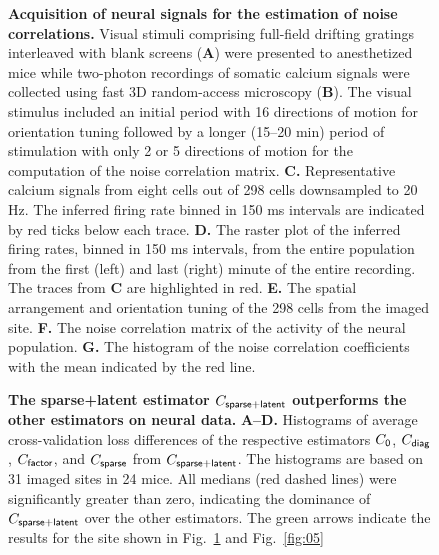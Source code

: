 \documentclass[10pt]{article}
\begin{document}
\begin{figure}[!ht]
    \begin{center}
    \end{center}
    \caption{{\bf Acquisition of neural signals for the estimation of noise correlations.}
    Visual stimuli comprising full-field drifting gratings interleaved with blank screens ({\bf A}) were presented to anesthetized mice while two-photon recordings of somatic calcium signals were collected using fast 3D random-access microscopy ({\bf B}). The visual stimulus included an initial period with 16 directions of motion for orientation tuning followed by a longer (15--20 min) period of stimulation with only 2 or 5 directions of motion for the computation of the noise correlation matrix. 
    {\bf C.} Representative calcium signals from eight cells out of 298 cells downsampled to 20 Hz. The inferred firing rate binned in 150 ms intervals are indicated by red ticks below each trace.
    {\bf D.} The raster plot of the inferred firing rates, binned in 150 ms intervals, from the entire population from the first (left) and last (right) minute of the entire recording.  The traces from {\bf C} are highlighted in red.
    {\bf E.} The spatial arrangement and orientation tuning of the 298 cells from the imaged site.
    {\bf F.} The noise correlation matrix of the activity of the neural population. 
    {\bf G.} The histogram of the noise correlation coefficients with the mean indicated by the red line.
}
    \label{fig:03}
\end{figure}

\begin{figure}[!ht]
    \begin{center}
    \end{center}
    \caption{{\bf The sparse+latent estimator $C_{\sf sparse+latent}$ outperforms the other estimators on neural data.}
    {\bf A--D.} Histograms of average cross-validation loss differences of the respective estimators $C_{\sf 0}$, $C_{\sf diag}$, $C_{\sf factor}$, and $C_{\sf sparse}$ from $C_{\sf sparse+latent}$. 
    The histograms are based on 31 imaged sites in 24 mice. 
    All medians (red dashed lines) were significantly greater than zero, indicating the dominance of $C_{\sf sparse+latent}$ over the other estimators. 
    The green arrows indicate the results for the site shown in Fig.~\ref{fig:03} and Fig.~\ref{fig:05}
    }
    \label{fig:04}
\end{figure}
        
\end{document}
